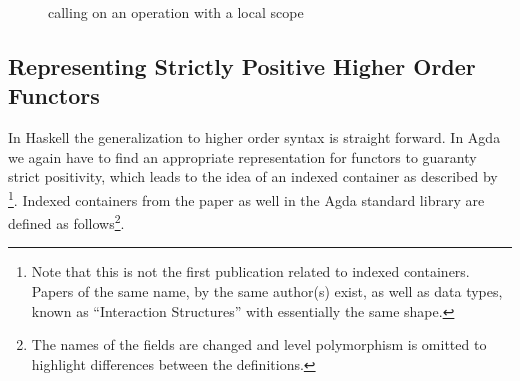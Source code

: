 \begin{figure}
  \begin{center}
  \end{center}
  \caption{calling \bind{} on an operation with a local scope}
  \label{higher-order:syntax:bind}
\end{figure}


\subsection{Representing Strictly Positive Higher Order Functors}
\label{higher-order:container}

In Haskell the generalization to higher order syntax is straight forward.
In Agda we again have to find an appropriate representation for functors to
guaranty strict positivity, which leads to the idea of an indexed container as
described by \textcite{DBLP:journals/jfp/AltenkirchGHMM15}
\footnote{Note that this is not the first publication related to indexed
  containers. Papers of the same name, by the same author(s) exist, as well as
  data types, known as ``Interaction Structures'' with essentially the same
  shape.}. 
Indexed containers from the paper as well in the Agda standard library are
defined as follows\footnote{The names of the fields are changed and level
  polymorphism is omitted to highlight differences between the definitions.}.


